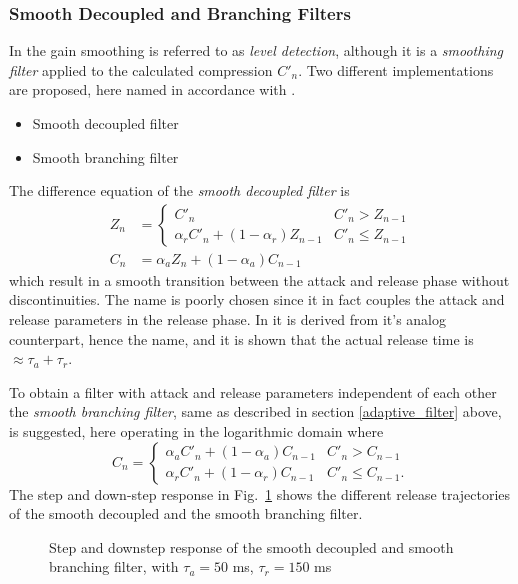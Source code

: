 \documentclass[../main2.tex]{subfiles}
\providecommand{\rootdir}{..}
\begin{document}
\subsubsection{Smooth Decoupled and Branching Filters}
In \cite{reiss2012tutorial} the gain smoothing is referred to as \emph{level detection}, although it is a \emph{smoothing filter} applied to the calculated compression $C'_n$. Two different implementations are proposed, here named in accordance with \cite{reiss2012tutorial}.
\begin{itemize}
\item{Smooth decoupled filter}
\item{Smooth branching filter}
\end{itemize}
The difference equation of the \emph{smooth decoupled filter} is
\begin{equation}\label{eq:smooth_decoupled_det}
\begin{split}
Z_n &= \begin{cases}
   C'_n								& C'_n > Z_{n-1} \\
    \alpha_{r} C'_n + (1-\alpha_{r}) Z_{n-1} 	& C'_n \leq Z_{n-1}
\end{cases} \\
C_n &= \alpha_{a} Z_n + (1-\alpha_{a}) C_{n-1}
\end{split}
\end{equation}
which result in a smooth transition between the attack and release phase without discontinuities. The name is poorly chosen since it in fact couples the attack and release parameters in the release phase. In \cite{reiss2012tutorial} it is derived from it's analog counterpart, hence the name, and it is shown that the actual release time is $\approx \tau_a + \tau_r$.

To obtain a filter with attack and release parameters independent of each other the \emph{smooth branching filter}, same as described in section \ref{adaptive_filter} above, is suggested, here operating in the logarithmic domain where 
\begin{equation}\label{eq:smooth_branching_det}
C_n = \begin{cases}
    \alpha_{a} C'_n + (1-\alpha_{a}) C_{n-1} 	& C'_n > C_{n-1} \\
    \alpha_{r} C'_n + (1-\alpha_{r}) C_{n-1} 	& C'_n \leq C_{n-1}.
\end{cases}
\end{equation}
The step and down-step response in Fig.~\ref{fig:step_reiss_filter} shows the different release trajectories of the smooth decoupled and the smooth branching filter.%
\begin{figure}
\centerline{}
\caption{Step and downstep response of the smooth decoupled and smooth branching filter, with $\tau_a = 50$ ms, $\tau_r = 150$ ms}
\label{fig:step_reiss_filter}
\end{figure}
\end{document}
